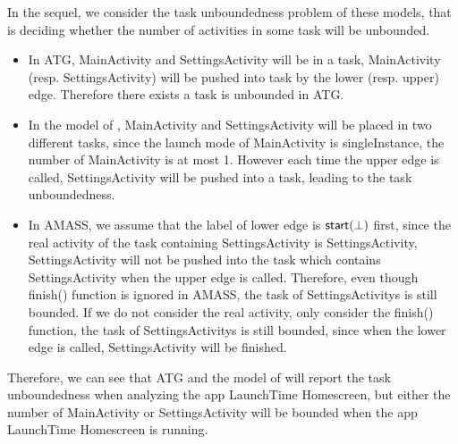{In the sequel, we consider the task unboundedness problem of these models, that is deciding whether the number of activities in some task will be unbounded. 
\begin{itemize}
	\item In ATG, MainActivity and SettingsActivity will be in a task, MainActivity (resp. SettingsActivity) will be pushed into task by the lower (resp. upper) edge. Therefore there exists a task is unbounded in ATG.
	\item In the model of \cite{LHR17}, MainActivity and SettingsActivity will be placed in two different tasks, since the launch mode of  MainActivity is singleInstance, the number of MainActivity is at most 1. However each time the upper edge is called, SettingsActivity will be pushed into a task, leading to the task unboundedness.
	\item In AMASS, we assume that the label of lower edge is ${\mathsf{start} }(\bot)$ first, since the real activity of the task containing SettingsActivity is SettingsActivity, SettingsActivity will not be pushed into the task which contains SettingsActivity when the upper edge is called. Therefore, even though finish() function is ignored in AMASS, the task of SettingsActivitys is still bounded. If we do not consider the real activity, only consider the finish() function, the task of SettingsActivitys is still bounded, since when the lower edge is called, SettingsActivity will be finished.
\end{itemize}
Therefore, we can see that ATG and the model of \cite{LHR17} will report the task unboundedness when analyzing the app LaunchTime Homescreen, but either the number of MainActivity or SettingsActivity will be bounded when the app LaunchTime Homescreen is running.
}

